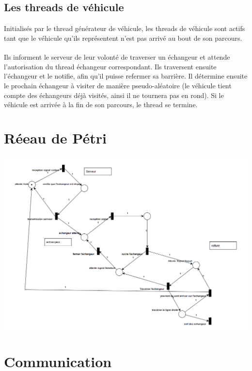 \documentclass{report}
\begin{document}
	\subsection{Les threads de véhicule}
	\paragraph{}
	Initialisés par le thread générateur de véhicule, les threads de véhicule sont actifs tant que le véhicule qu'ils représentent n'est pas arrivé au bout de son parcours.
	\paragraph{}
	Ils informent le serveur de leur volonté de traverser un échangeur et attende l'autorisation du thread échangeur correspondant. Ils traversent ensuite l'échangeur et le notifie, afin qu'il puisse refermer sa barrière. Il détermine ensuite le prochain échangeur à visiter de manière pseudo-aléatoire (le véhicule tient compte des échangeurs déjà visités, ainsi il ne tournera pas en rond). Si le véhicule est arrivée à la fin de son parcours, le thread se termine.
	\newpage
	\section{Réeau de Pétri}
	\begin{center}
	\includegraphics[scale=0.4]{Petri}
	\end{center}
	
		\newpage
	
	\section{Communication}
\end{document}
